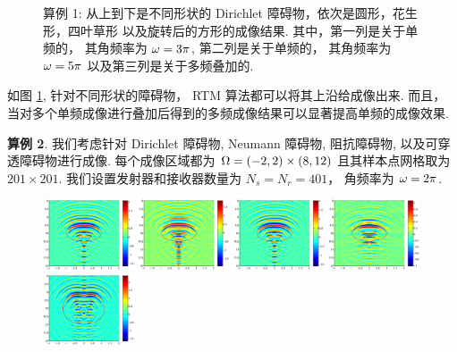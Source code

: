 {\begin{figure}[htbp]
	\caption{算例 1: 从上到下是不同形状的 Dirichlet 障碍物，依次是圆形，花生形，四叶草形 以及旋转后的方形的成像结果. 其中，第一列是关于单频的， 其角频率为 $\omega=3\pi$, 第二列是关于单频的， 其角频率为 $\omega=5\pi$ 以及第三列是关于多频叠加的.}\label{figure_21}
\end{figure}
如图 \ref{figure_21}, 针对不同形状的障碍物， RTM 算法都可以将其上沿给成像出来. 而且， 当对多个单频成像进行叠加后得到的多频成像结果可以显著提高单频的成像效果.

\bigskip
\textbf{算例 2}.
我们考虑针对 Dirichlet 障碍物,  Neumann 障碍物, 阻抗障碍物, 以及可穿透障碍物进行成像. 每个成像区域都为 $\Omega=(-2,2) \times (8, 12)$ 且其样本点网格取为 $201 \times 201$. 我们设置发射器和接收器数量为 $N_s = N_r = 401$， 角频率为 $\omega=2\pi$. 
\begin{figure}[htbp]
	\centering
	\includegraphics[width=0.24\textwidth]{./Img/graphic/circle_3pi.eps}
	\includegraphics[width=0.24\textwidth]{./Img/graphic/circle_3pi_neumann.eps}
	\includegraphics[width=0.24\textwidth]{./Img/graphic/circle_3pi_impedance_1.eps}
	\includegraphics[width=0.24\textwidth]{./Img/graphic/circle_3pi_transmission.eps}
	\includegraphics[width=0.24\textwidth]{./Img/graphic/peanut_3pi.eps}

\end{figure}}
